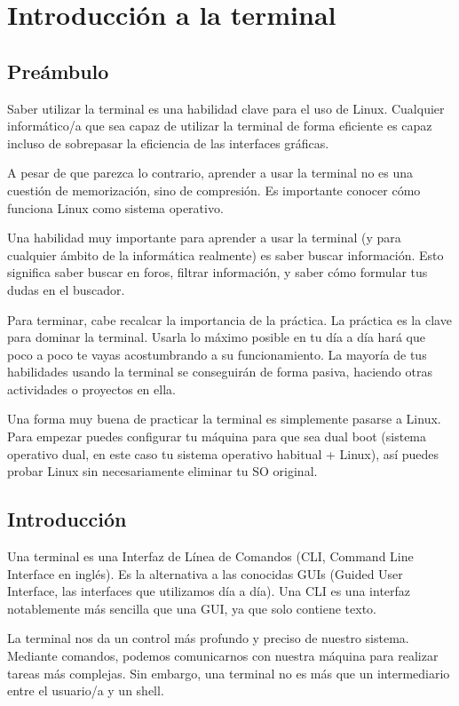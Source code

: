 \chapter{Introducción a la terminal}
\section{Preámbulo}
Saber utilizar la terminal es una habilidad clave para el uso de Linux. Cualquier informático/a que sea capaz de utilizar la terminal de forma eficiente es capaz incluso de sobrepasar la eficiencia de las interfaces gráficas.

A pesar de que parezca lo contrario, aprender a usar la terminal no es una cuestión de memorización, sino de compresión. Es importante conocer cómo funciona Linux como sistema operativo.

Una habilidad muy importante para aprender a usar la terminal (y para cualquier ámbito de la informática realmente) es saber buscar información. Esto significa saber buscar en foros, filtrar información, y saber cómo formular tus dudas en el buscador.

Para terminar, cabe recalcar la importancia de la práctica. La práctica es la clave para dominar la terminal. Usarla lo máximo posible en tu día a día hará que poco a poco te vayas acostumbrando a su funcionamiento. La mayoría de tus habilidades usando la terminal se conseguirán de forma pasiva, haciendo otras actividades o proyectos en ella.

Una forma muy buena de practicar la terminal es simplemente pasarse a Linux. Para empezar puedes configurar tu máquina para que sea dual boot (sistema operativo dual, en este caso tu sistema operativo habitual + Linux), así puedes probar Linux sin necesariamente eliminar tu SO original.

\section{Introducción}
Una terminal es una Interfaz de Línea de Comandos (CLI, Command Line Interface en inglés). Es la alternativa a las conocidas GUIs (Guided User Interface, las interfaces que utilizamos día a día). Una CLI es una interfaz notablemente más sencilla que una GUI, ya que solo contiene texto.

La terminal nos da un control más profundo y preciso de nuestro sistema. Mediante comandos, podemos comunicarnos con nuestra máquina para realizar tareas más complejas. Sin embargo, una terminal no es más que un intermediario entre el usuario/a y un shell.

